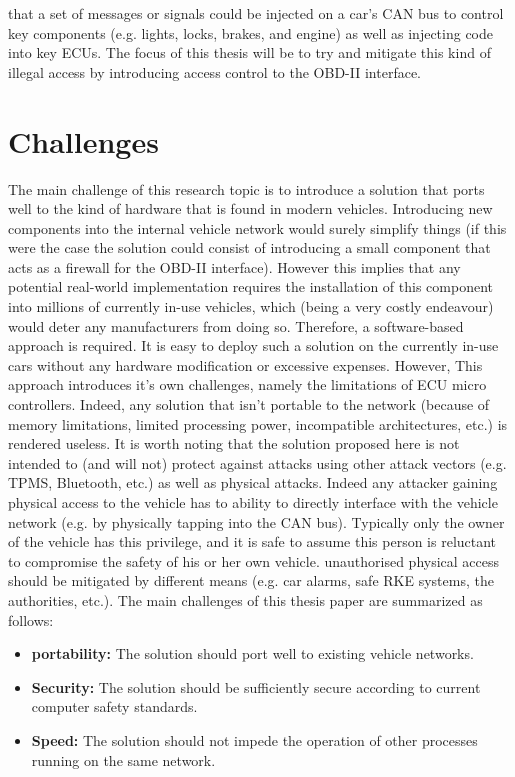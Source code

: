\cite{MillerA}\cite{Yadav16}\cite{MillerB}\cite{MillerC} that a set of messages or signals could be injected on a car's CAN bus to control key components (e.g. lights, locks, brakes, and engine) as well as injecting code into key ECUs. The focus of this thesis will be to try and mitigate this kind of illegal access by introducing access control to the OBD-II interface.

\section{Challenges} \label{sec:challenges}
The main challenge of this research topic is to introduce a solution that ports well to the kind of hardware that is found in modern vehicles. Introducing new components into the internal vehicle network would surely simplify things (if this were the case the solution could consist of introducing a small component that acts as a firewall for the OBD-II interface). However this implies that any potential real-world implementation requires the installation of this component into millions of currently in-use vehicles, which (being a very costly endeavour) would deter any manufacturers from doing so. Therefore, a software-based approach is required. It is easy to deploy such a solution on the currently in-use cars without any hardware modification or excessive expenses. However, This approach introduces it's own challenges, namely the limitations of ECU micro controllers. Indeed, any solution that isn't portable to the network (because of memory limitations, limited processing power, incompatible architectures, etc.) is rendered useless. It is worth noting that the solution proposed here is not intended to (and will not) protect against attacks using other attack vectors (e.g. TPMS, Bluetooth, etc.) as well as physical attacks. Indeed any attacker gaining physical access to the vehicle has to ability to directly interface with the vehicle network (e.g. by physically tapping into the CAN bus). Typically only the owner of the vehicle has this privilege, and it is safe to assume this person is reluctant to compromise the safety of his or her own vehicle. unauthorised physical access should be mitigated by different means (e.g. car alarms, safe RKE systems, the authorities, etc.). The main challenges of this thesis paper are summarized as follows:

\begin{itemize}
	\item \textbf{portability:} The solution should port well to existing vehicle networks. 
	\item \textbf{Security:} The solution should be sufficiently secure according to current computer safety standards. 
	\item \textbf{Speed:} The solution should not impede the operation of other processes running on the same network.
\end{itemize}

